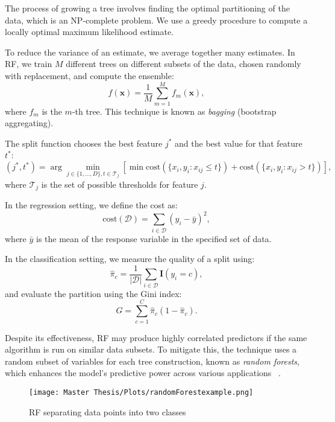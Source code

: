 The process of growing a tree involves finding the optimal partitioning of the data, which is an NP-complete problem. We use a greedy procedure to compute a locally optimal maximum likelihood estimate.

To reduce the variance of an estimate, we average together many estimates. In RF, we train $M$ different trees on different subsets of the data, chosen randomly with replacement, and compute the ensemble:
\begin{equation}
    f(\mathbf{x}) = \frac{1}{M} \sum_{m=1}^M f_m(\mathbf{x}),
\end{equation}
where $f_m$ is the $m$-th tree. This technique is known as \textit{bagging} (bootstrap aggregating).

The split function chooses the best feature $j^*$ and the best value for that feature $t^*$:
\begin{equation}
    (j^*, t^*) = \arg \min_{j \in \{1, \ldots, D\}, t \in \mathcal{T}_j} \left[ \min \text{cost} \left( \{x_i, y_i : x_{ij} \leq t \} \right) + \text{cost} \left( \{x_i, y_i : x_{ij} > t \} \right) \right],
\end{equation}
where $\mathcal{T}_j$ is the set of possible thresholds for feature $j$.

In the regression setting, we define the cost as:
\begin{equation}
    \text{cost}(\mathcal{D}) = \sum_{i \in \mathcal{D}} (y_i - \bar{y})^2,
\end{equation}
where $\bar{y}$ is the mean of the response variable in the specified set of data.

In the classification setting, we measure the quality of a split using:
\begin{equation}
    \hat{\pi}_c = \frac{1}{|\mathcal{D}|} \sum_{i \in \mathcal{D}} \mathbf{I}(y_i = c),
\end{equation}
and evaluate the partition using the Gini index:
\begin{equation}
    G = \sum_{c=1}^C \hat{\pi}_c (1 - \hat{\pi}_c).
\end{equation}

Despite its effectiveness, RF may produce highly correlated predictors if the same algorithm is run on similar data subsets. To mitigate this, the technique uses a random subset of variables for each tree construction, known as \emph{random forests}, which enhances the model's predictive power across various applications ~\cite{murphy2013machine}.

\FloatBarrier
\begin{figure}[h!]
    \centering
    \texttt{[image: Master Thesis/Plots/randomForestexample.png]}
    \caption{RF separating data points into two classes}
    \label{fig:RF}
\end{figure}
\FloatBarrier

